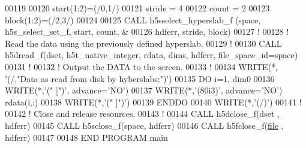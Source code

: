 \begin{DoxyCode}
00119 
00120   start(1:2)=(/0,1/)
00121   stride = 4
00122   count = 2
00123   block(1:2)=(/2,3/)
00124 
00125   \textcolor{keyword}{CALL }h5sselect\_hyperslab\_f (space, h5s\_select\_set\_f, start, count, &
00126        hdferr, stride, block)
00127   \textcolor{comment}{!}
00128   \textcolor{comment}{! Read the data using the previously defined hyperslab.}
00129   \textcolor{comment}{!}
00130   \textcolor{keyword}{CALL }h5dread\_f(dset, h5t\_native\_integer, rdata, dims, hdferr, file\_space\_id=space)
00131   \textcolor{comment}{!}
00132   \textcolor{comment}{! Output the DATA to the screen.}
00133   \textcolor{comment}{!}
00134   \textcolor{keyword}{WRITE}(*, \textcolor{stringliteral}{'(/,"Data as read from disk by hyberslabs:")'})
00135   \textcolor{keywordflow}{DO} i=1, dim0
00136      \textcolor{keyword}{WRITE}(*,\textcolor{stringliteral}{'(" [")'}, advance=\textcolor{stringliteral}{'NO'})
00137      \textcolor{keyword}{WRITE}(*,\textcolor{stringliteral}{'(80i3)'}, advance=\textcolor{stringliteral}{'NO'}) rdata(i,:)
00138      \textcolor{keyword}{WRITE}(*,\textcolor{stringliteral}{'(" ]")'})
00139 \textcolor{keywordflow}{  ENDDO}
00140   \textcolor{keyword}{WRITE}(*,\textcolor{stringliteral}{'(/)'})
00141   \textcolor{comment}{!}
00142   \textcolor{comment}{! Close and release resources.}
00143   \textcolor{comment}{!}
00144   \textcolor{keyword}{CALL }h5dclose\_f(dset , hdferr)
00145   \textcolor{keyword}{CALL }h5sclose\_f(space, hdferr)
00146   \textcolor{keyword}{CALL }h5fclose\_f(\hyperlink{structfile}{file} , hdferr)
00147   
00148 \textcolor{keyword}{END PROGRAM }main
\end{DoxyCode}
